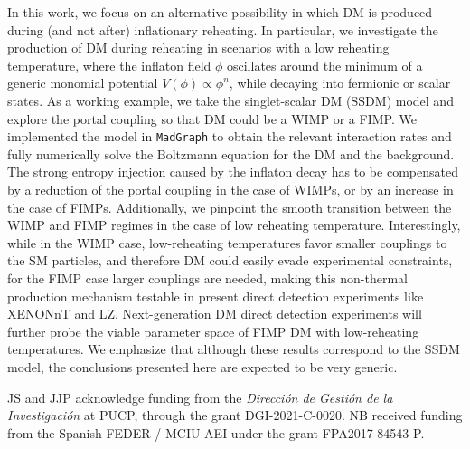 \documentclass[a4paper,11pt]{article}
\begin{document}
In this work, we focus on an alternative possibility in which DM is produced during (and not after) inflationary reheating. In particular,  we investigate the production of DM during reheating in scenarios with a low reheating temperature, where the inflaton field $\phi$ oscillates around the minimum of a generic monomial potential $V(\phi) \propto \phi^n$, while decaying into fermionic or scalar states.
As a working example, we take the singlet-scalar DM (SSDM) model and explore the portal coupling so that DM could be a WIMP or a FIMP.
We implemented the model in \texttt{MadGraph} to obtain the relevant interaction rates and fully numerically solve the Boltzmann equation for the DM and the background.
The strong entropy injection caused by the inflaton decay has to be compensated by a reduction of the portal coupling in the case of WIMPs, or by an increase in the case of FIMPs.
Additionally, we pinpoint the smooth transition between the WIMP and FIMP regimes in the case of low reheating temperature.
Interestingly, while in the WIMP case, low-reheating temperatures favor smaller couplings to the SM particles, and therefore DM could easily evade experimental constraints, for the FIMP case larger couplings are needed, making this non-thermal production mechanism testable in present direct detection experiments like XENONnT and LZ. Next-generation DM direct detection experiments will further probe the viable parameter space of FIMP DM with low-reheating temperatures.
We emphasize that although these results correspond to the SSDM model, the conclusions presented here are expected to be very generic.

\acknowledgments
JS and JJP acknowledge funding from the {\it Dirección de Gestión de la Investigación} at PUCP, through the grant DGI-2021-C-0020.
NB received funding from the Spanish FEDER / MCIU-AEI under the grant FPA2017-84543-P.



\end{document}
